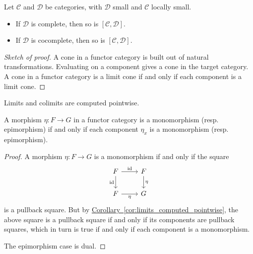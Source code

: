 \documentclass[main.tex]{subfiles}
\begin{document}
\begin{theorem}
  \label{thm:functor_categories_complete_cocomplete}
  Let $\mathcal{C}$ and $\mathcal{D}$ be categories, with $\mathcal{D}$ small and $\mathcal{C}$ locally small.
  \begin{itemize}
    \item If $\mathcal{D}$ is complete, then so is $[\mathcal{C}, \mathcal{D}]$.

    \item If $\mathcal{D}$ is cocomplete, then so is $[\mathcal{C}, \mathcal{D}]$.
  \end{itemize}
\end{theorem}
\begin{proof}[Sketch of proof]
  A cone in a functor category is built out of natural transformations. Evaluating on a component gives a cone in the target category. A cone in a functor category is a limit cone if and only if each component is a limit cone.
\end{proof}

\begin{corollary}
  \label{cor:limits_computed_pointwise}
  Limits and colimits are computed pointwise.
\end{corollary}

\begin{corollary}
  \label{cor:monos_epis_in_functor_category_preserved_pointwise}
  A morphism $\eta\colon F \to G$ in a functor category is a monomorphism (resp. epimorphism) if and only if each component $\eta_{x}$ is a monomorphism (resp. epimorphism).
\end{corollary}
\begin{proof}
  A morphism $\eta\colon F \to G$ is a monomorphism if and only if the square
  \begin{equation*}
    \begin{tikzcd}
      F
      \arrow[r, "\id"]
      \arrow[d, swap, "\id"]
      & F
      \arrow[d, "\eta"]
      \\
      F
      \arrow[r, swap, "\eta"]
      & G
    \end{tikzcd}
  \end{equation*}
  is a pullback square. But by \hyperref[cor:limits_computed_pointwise]{Corollary~\ref*{cor:limits_computed_pointwise}}, the above square is a pullback square if and only if its components are pullback squares, which in turn is true if and only if each component is a monomorphism.

  The epimorphism case is dual.
\end{proof}
\end{document}
